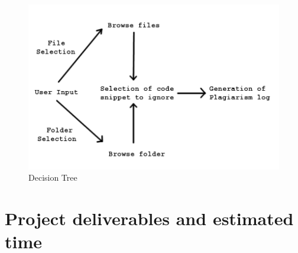 \documentclass[11pt]{article}
\begin{document}
\begin{figure}[h!]

  \centering
    \includegraphics[width=1.2\textwidth]{DecisionTree}
      \caption{Decision Tree}
\end{figure}

\section{Project deliverables and estimated time}
\end{document}
